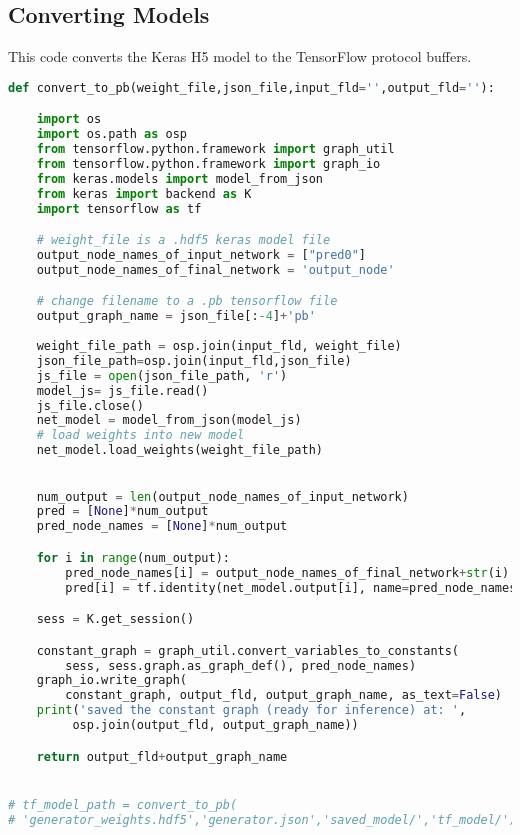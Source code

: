 \subsection{Converting Models} %
\label{sub:converting_models}
This code converts the Keras H5 model to the TensorFlow protocol buffers.
\begin{lstlisting}[basicstyle=\scriptsize,language=Python]
def convert_to_pb(weight_file,json_file,input_fld='',output_fld=''):

    import os
    import os.path as osp
    from tensorflow.python.framework import graph_util
    from tensorflow.python.framework import graph_io
    from keras.models import model_from_json
    from keras import backend as K
    import tensorflow as tf

    # weight_file is a .hdf5 keras model file
    output_node_names_of_input_network = ["pred0"] 
    output_node_names_of_final_network = 'output_node'

    # change filename to a .pb tensorflow file
    output_graph_name = json_file[:-4]+'pb'
    
    weight_file_path = osp.join(input_fld, weight_file)
    json_file_path=osp.join(input_fld,json_file)
    js_file = open(json_file_path, 'r')
    model_js= js_file.read()
    js_file.close()
    net_model = model_from_json(model_js)
    # load weights into new model
    net_model.load_weights(weight_file_path)
    

    num_output = len(output_node_names_of_input_network)
    pred = [None]*num_output
    pred_node_names = [None]*num_output

    for i in range(num_output):
        pred_node_names[i] = output_node_names_of_final_network+str(i)
        pred[i] = tf.identity(net_model.output[i], name=pred_node_names[i])

    sess = K.get_session()

    constant_graph = graph_util.convert_variables_to_constants(
        sess, sess.graph.as_graph_def(), pred_node_names)
    graph_io.write_graph(
        constant_graph, output_fld, output_graph_name, as_text=False)
    print('saved the constant graph (ready for inference) at: ',
         osp.join(output_fld, output_graph_name))

    return output_fld+output_graph_name


# tf_model_path = convert_to_pb(
# 'generator_weights.hdf5','generator.json','saved_model/','tf_model/')
\end{lstlisting}

